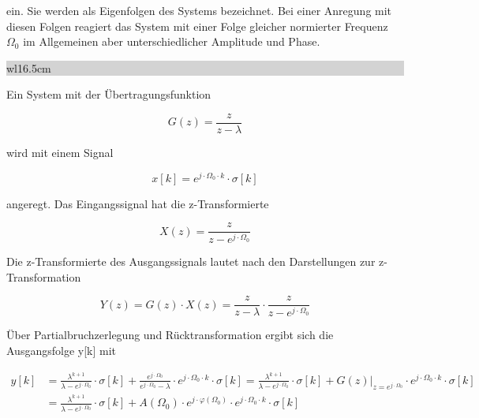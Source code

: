 \noindent ein. Sie werden als Eigenfolgen des Systems bezeichnet. Bei einer Anregung mit diesen Folgen reagiert das System mit einer Folge gleicher normierter Frequenz $\Omega_{0}$ im Allgemeinen aber unterschiedlicher Amplitude und Phase.\bigskip

\noindent
\colorbox{lightgray}{%
%
\renewcommand\arraystretch{0.6}%
\begin{tabular}{ wl{16.5cm} }
{\selectfont{Beispiel: Anregung eines Systems 1. Ordnung mit einer komplexen Exponentialfolge}}
\end{tabular}%
}\medskip

\noindent Ein System mit der \"{U}bertragungsfunktion

\begin{equation}\label{eq:seventwo}
G\left(z\right)=\frac{z}{z-\lambda }
\end{equation}

\noindent wird mit einem Signal 

\begin{equation}\label{eq:seventhree}
x\left[k\right]=e^{j\cdot \Omega _{0} \cdot k} \cdot \sigma \left[k\right]
\end{equation}

\noindent angeregt. Das Eingangssignal hat die z-Transformierte 

\begin{equation}\label{eq:sevenfour}
X\left(z\right)=\frac{z}{z-e^{j\cdot \Omega _{0}}}
\end{equation}

\noindent Die z-Transformierte des Ausgangssignals lautet nach den Darstellungen zur z-Transformation 

\begin{equation}\label{eq:sevenfive}
Y\left(z\right)=G\left(z\right)\cdot X\left(z\right)=\frac{z}{z-\lambda } \cdot \frac{z}{z-e^{j\cdot \Omega _{0}}}
\end{equation}

\noindent \"{U}ber Partialbruchzerlegung und R\"{u}cktransformation ergibt sich die Ausgangsfolge y[k] mit

\begin{equation}\label{eq:sevensix}
\begin{split}
y\left[k\right] &=\frac{\lambda ^{k+1} }{\lambda -e^{j\cdot \Omega _{0} } } \cdot \sigma \left[k\right]+\frac{e^{j\cdot \Omega _{0} } }{e^{j\cdot \Omega _{0} } -\lambda } \cdot e^{j\cdot \Omega _{0} \cdot k} \cdot \sigma \left[k\right]=\frac{\lambda ^{k+1} }{\lambda -e^{j\cdot \Omega _{0} } } \cdot \sigma \left[k\right]+\left. G\left(z\right)\right|_{z=e^{j\cdot \Omega _{0} } } \cdot e^{j\cdot \Omega _{0} \cdot k} \cdot \sigma \left[k\right] \\ 
&=\frac{\lambda ^{k+1} }{\lambda -e^{j\cdot \Omega _{0} } } \cdot \sigma \left[k\right]+A\left(\Omega _{0} \right)\cdot e^{j\cdot \varphi \left(\Omega _{0} \right)} \cdot e^{j\cdot \Omega _{0} \cdot k} \cdot \sigma \left[k\right]
\end{split}
\end{equation}

